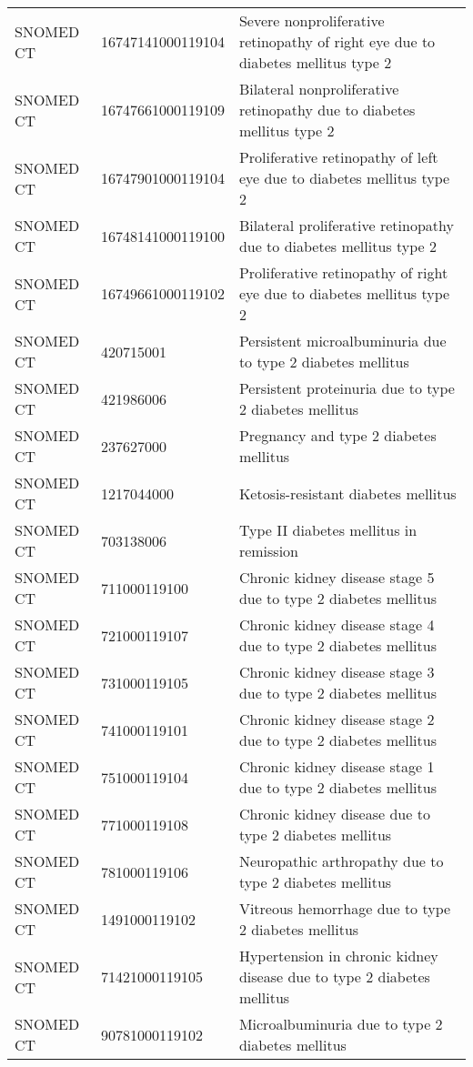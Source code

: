 \begin{longtable}{p{}p{}p{}}
  SNOMED CT & 16747141000119104 & Severe nonproliferative retinopathy of right eye due to diabetes mellitus type 2 \\ 
  SNOMED CT & 16747661000119109 & Bilateral nonproliferative retinopathy due to diabetes mellitus type 2 \\ 
  SNOMED CT & 16747901000119104 & Proliferative retinopathy of left eye due to diabetes mellitus type 2 \\ 
  SNOMED CT & 16748141000119100 & Bilateral proliferative retinopathy due to diabetes mellitus type 2 \\ 
  SNOMED CT & 16749661000119102 & Proliferative retinopathy of right eye due to diabetes mellitus type 2 \\ 
  SNOMED CT & 420715001 & Persistent microalbuminuria due to type 2 diabetes mellitus \\ 
  SNOMED CT & 421986006 & Persistent proteinuria due to type 2 diabetes mellitus \\ 
  SNOMED CT & 237627000 & Pregnancy and type 2 diabetes mellitus \\ 
  SNOMED CT & 1217044000 & Ketosis-resistant diabetes mellitus \\ 
  SNOMED CT & 703138006 & Type II diabetes mellitus in remission \\ 
  SNOMED CT & 711000119100 & Chronic kidney disease stage 5 due to type 2 diabetes mellitus \\ 
  SNOMED CT & 721000119107 & Chronic kidney disease stage 4 due to type 2 diabetes mellitus \\ 
  SNOMED CT & 731000119105 & Chronic kidney disease stage 3 due to type 2 diabetes mellitus \\ 
  SNOMED CT & 741000119101 & Chronic kidney disease stage 2 due to type 2 diabetes mellitus \\ 
  SNOMED CT & 751000119104 & Chronic kidney disease stage 1 due to type 2 diabetes mellitus \\ 
  SNOMED CT & 771000119108 & Chronic kidney disease due to type 2 diabetes mellitus \\ 
  SNOMED CT & 781000119106 & Neuropathic arthropathy due to type 2 diabetes mellitus \\ 
  SNOMED CT & 1491000119102 & Vitreous hemorrhage due to type 2 diabetes mellitus \\ 
  SNOMED CT & 71421000119105 & Hypertension in chronic kidney disease due to type 2 diabetes mellitus \\ 
  SNOMED CT & 90781000119102 & Microalbuminuria due to type 2 diabetes mellitus \\ 

\end{longtable}
